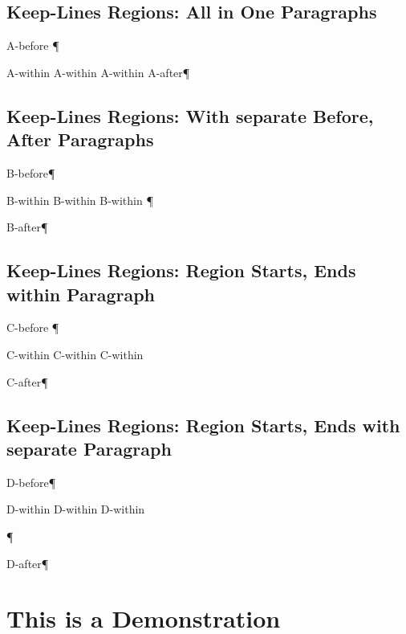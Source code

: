 \section{Keep-Lines Regions: All in One Paragraphs
}
A-before
¶\par
\begingroup\obeyalllines{}A-within
A-within
A-within
\endgroup{}A-after¶\par

\section{Keep-Lines Regions: With separate Before, After Paragraphs
}
B-before¶\par
\begingroup\obeyalllines{}B-within
B-within
B-within
\endgroup{}¶\par
B-after¶\par

\section{Keep-Lines Regions: Region Starts, Ends within Paragraph
}
C-before
¶\par
\begingroup\obeyalllines{}

C-within
C-within
C-within

\endgroup{}C-after¶\par

\section{Keep-Lines Regions: Region Starts, Ends with separate Paragraph
}
D-before¶\par
\begingroup\obeyalllines{}

D-within
D-within
D-within

\endgroup{}¶\par
D-after¶\par
{}
\chapter{This is a Demonstration 
}

